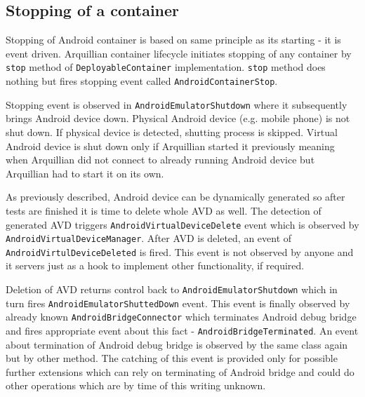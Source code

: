\documentclass[12pt,final,oneside]{fithesis}
\begin{document}
		\subsection{Stopping of a container}

Stopping of Android container is based on same principle as its starting - it is event driven. Arquillian container lifecycle initiates stopping of any container by \texttt{stop} method of \texttt{DeployableContainer} implementation. \texttt{stop} method does nothing but fires stopping event called \texttt{AndroidContainerStop}.

Stopping event is observed in \texttt{AndroidEmulatorShutdown} where it subsequently brings Android device down. Physical Android device (e.g. mobile phone) is not shut down. If physical device is detected, shutting process is skipped. Virtual Android device is shut down only if Arquillian started it previously meaning when Arquillian did not connect to already running Android device but Arquillian had to start it on its own.

As previously described, Android device can be dynamically generated so after tests are finished it is time to delete whole AVD as well. The detection of generated AVD triggers \texttt{AndroidVirtualDeviceDelete} event which is observed by \texttt{AndroidVirtualDeviceManager}. After AVD is deleted, an event of \texttt{AndroidVirtulDeviceDeleted} is fired. This event is not observed by anyone and it servers just as a hook to implement other functionality, if required.

Deletion of AVD returns control back to \texttt{AndroidEmulatorShutdown} which in turn fires \texttt{AndroidEmulatorShuttedDown} event. This event is finally observed by already known \texttt{AndroidBridgeConnector} which terminates Android debug bridge and fires appropriate event about this fact - \texttt{AndroidBridgeTerminated}. An event about termination of Android debug bridge is observed by the same class again but by other method. The catching of this event is provided only for possible further extensions which can rely on terminating of Android bridge and could do other operations which are by time of this writing unknown.
\end{document}
